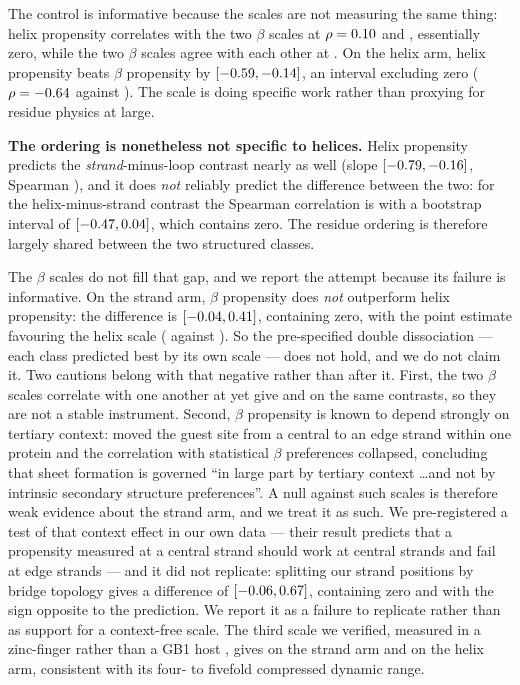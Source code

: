 \documentclass[11pt]{article}
\begin{document}
The control is informative because the scales are not measuring the same thing: helix
propensity correlates with the two $\beta$ scales at $\rho = 0.10{}$ and
\CollinPaceSR{}, essentially zero, while the two $\beta$ scales agree with each other at
\CollinMKSR{}. On the helix arm, helix propensity beats $\beta$ propensity by
\DiffHelix{} $[-0.59{}, -0.14{}]$, an interval excluding zero
($\rho = -0.64{}$ against \RhoHelMK{}). The scale is doing specific work rather than
proxying for residue physics at large.

\textbf{The ordering is nonetheless not specific to helices.} Helix propensity predicts the
\emph{strand}-minus-loop contrast nearly as well (slope \SlopeStrand{}
$[-0.79{}, -0.16{}]$, Spearman \RhoStrand{}), and it does \emph{not} reliably
predict the difference between the two: for the helix-minus-strand contrast the Spearman
correlation is \RhoHE{} with a bootstrap interval of $[-0.47{}, 0.04{}]$, which contains
zero. The residue ordering is therefore largely shared between the two structured classes.

The $\beta$ scales do not fill that gap, and we report the attempt because its failure is
informative. On the strand arm, $\beta$ propensity does \emph{not} outperform helix propensity:
the difference is \DiffStrand{} $[-0.04{}, 0.41{}]$, containing zero, with the
point estimate favouring the helix scale (\RhoStrPace{} against \RhoStrMK{}). So the pre-specified
double dissociation --- each class predicted best by its own scale --- does not hold, and we do
not claim it. Two cautions belong with that negative rather than after it. First, the two
$\beta$ scales correlate with one another at \CollinMKSR{} yet give \RhoStrMK{} and \RhoStrSR{}
on the same contrasts, so they are not a stable instrument. Second, $\beta$ propensity is known
to depend strongly on tertiary context: \citet{minorkim1994b} moved the guest site from a central
to an edge strand within one protein and the correlation with statistical $\beta$ preferences
collapsed, concluding that sheet formation is governed ``in large part by tertiary context
\ldots and not by intrinsic secondary structure preferences''. A null against such scales is
therefore weak evidence about the strand arm, and we treat it as such. We pre-registered a
test of that context effect in our own data --- their result predicts that a propensity
measured at a central strand should work at central strands and fail at edge strands --- and
it did not replicate: splitting our strand positions by bridge topology gives a difference of
\DiffEdge{} $[-0.06{}, 0.67{}]$, containing zero and with the sign opposite to
the prediction. We report it as a failure to replicate rather than as support for a
context-free scale. The third scale we verified, measured in a zinc-finger rather than a GB1
host \citep{kimberg1993}, gives \RhoStrKB{} on the strand arm and \RhoHelKB{} on the helix arm,
consistent with its four- to fivefold compressed dynamic range.
\end{document}
